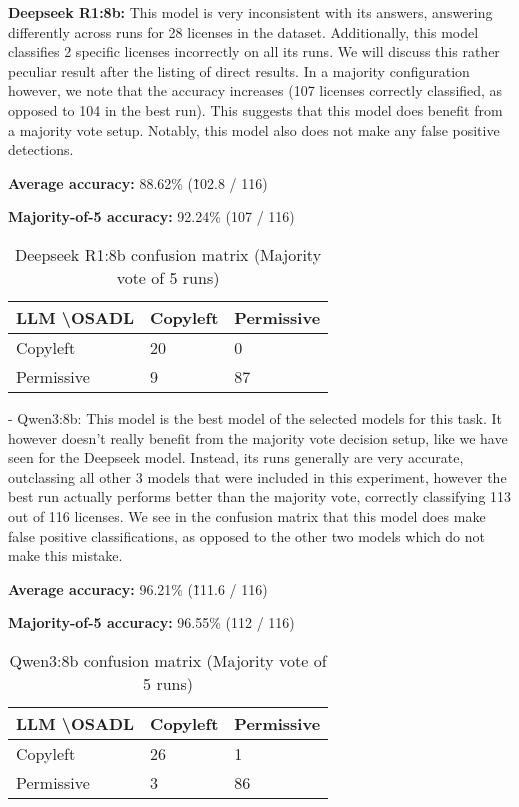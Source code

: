 \textbf{Deepseek R1:8b:} This model is very inconsistent with its answers, answering differently across runs for 28 licenses in the dataset. Additionally, this model classifies 2 specific licenses incorrectly on all its runs. We will discuss this rather peculiar result after the listing of direct results. In a majority configuration however, we note that the accuracy increases (107 licenses correctly classified, as opposed to 104 in the best run). This suggests that this model does benefit from a majority vote setup. Notably, this model also does not make any false positive detections.

\textbf{Average accuracy:} 88.62\% (\~ 102.8 / 116)

\textbf{Majority-of-5 accuracy:} 92.24\% (107 / 116)

\begin{table}[h]
	\caption{Deepseek R1:8b confusion matrix (Majority vote of 5 runs)}
	\label{tab:deepseekr1-confmatrix}
	\centering
	\begin{tabular}{l|ll}
		\hline
		\textbf{LLM \textbackslash OSADL} & Copyleft & Permissive \\ \hline
		Copyleft & 20 & 0 \\
		Permissive & 9 & 87 \\\hline
	\end{tabular}
\end{table}

- Qwen3:8b: This model is the best model of the selected models for this task. It however doesn't really benefit from the majority vote decision setup, like we have seen for the Deepseek model. Instead, its runs generally are very accurate, outclassing all other 3 models that were included in this experiment, however the best run actually performs better than the majority vote, correctly classifying 113 out of 116 licenses. We see in the confusion matrix that this model does make false positive classifications, as opposed to the other two models which do not make this mistake.

\textbf{Average accuracy:} 96.21\% (\~ 111.6 / 116)

\textbf{Majority-of-5 accuracy:} 96.55\% (112 / 116)

\begin{table}[h]
	\caption{Qwen3:8b confusion matrix (Majority vote of 5 runs)}
	\label{tab:qwen3-confmatrix}
	\centering
	\begin{tabular}{l|ll}
		\hline
		\textbf{LLM \textbackslash OSADL} & Copyleft & Permissive \\ \hline
		Copyleft & 26 & 1 \\
		Permissive & 3 & 86 \\\hline
	\end{tabular}
\end{table}

